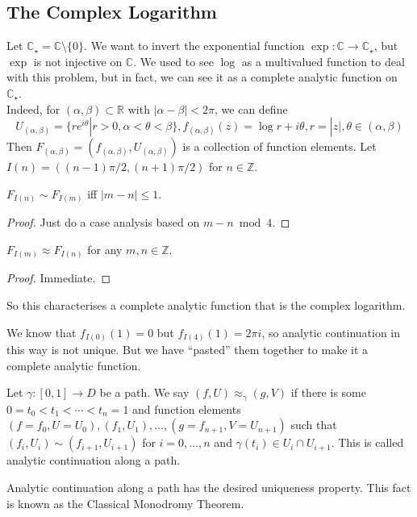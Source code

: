 \subsection{The Complex Logarithm}
Let $\mathbb C_\star=\mathbb C\setminus\{0\}$.
We want to invert the exponential function $\exp:\mathbb C\to\mathbb C_\star$, but $\exp$ is not injective on $\mathbb C$.
We used to see $\log$ as a multivalued function to deal with this problem, but in fact, we can see it as a complete analytic function on $\mathbb C_\star$.\\
Indeed, for $(\alpha,\beta)\subset\mathbb R$ with $|\alpha-\beta|<2\pi$, we can define
$$U_{(\alpha,\beta)}=\{re^{i\theta}|r>0,\alpha<\theta<\beta\},f_{(\alpha,\beta)}(z)=\log r+i\theta,r=|z|,\theta\in (\alpha,\beta)$$
Then $F_{(\alpha,\beta)}=(f_{(\alpha,\beta)},U_{(\alpha,\beta)})$ is a collection of function elements.
Let $I(n)=((n-1)\pi/2,(n+1)\pi/2)$ for $n\in\mathbb Z$.
\begin{proposition}
    $F_{I(n)}\sim F_{I(m)}$ iff $|m-n|\le 1$.
\end{proposition}
\begin{proof}
    Just do a case analysis based on $m-n\bmod 4$.
\end{proof}
\begin{corollary}
    $F_{I(m)}\approx F_{I(n)}$ for any $m,n\in\mathbb Z$.
\end{corollary}
\begin{proof}
    Immediate.
\end{proof}
So this characterises a complete analytic function that is the complex logarithm.
\begin{remark}
    We know that $f_{I(0)}(1)=0$ but $f_{I(4)}(1)=2\pi i$, so analytic continuation in this way is not unique.
    But we have ``pasted'' them together to make it a complete analytic function.
\end{remark}
\begin{definition}
    Let $\gamma:[0,1]\to D$ be a path.
    We say $(f,U)\approx_\gamma (g,V)$ if there is some $0=t_0<t_1<\cdots<t_n=1$ and function elements $(f=f_0,U=U_0),(f_1,U_1),\ldots,(g=f_{n+1},V=U_{n+1})$ such that $(f_i,U_i)\sim (f_{i+1},U_{i+1})$ for $i=0,\ldots,n$ and $\gamma(t_i)\in U_i\cap U_{i+1}$.
    This is called analytic continuation along a path.
\end{definition}
Analytic continuation along a path has the desired uniqueness property.
This fact is known as the Classical Monodromy Theorem.